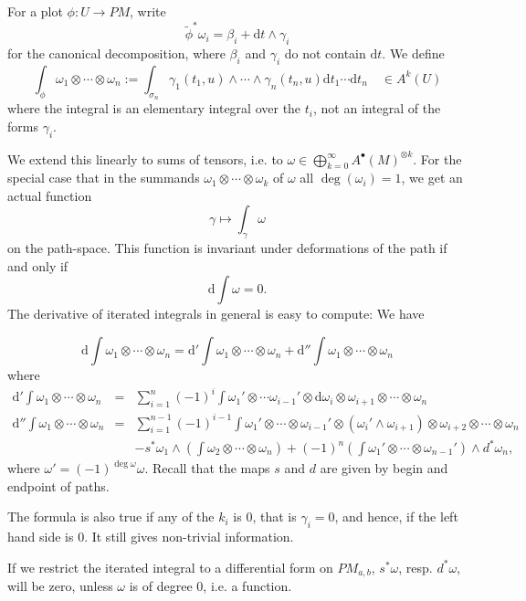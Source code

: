 For a plot $\phi: U \to PM$, write
\[
\widetilde{\phi}^* \omega_i = \beta_i + \mathrm{d}t \wedge \gamma_i
\]
for the canonical decomposition, where $\beta_i$ and $\gamma_i$ do not contain $\mathrm{d}t$.
We define
\[
\int_\phi \omega_1 \otimes \cdots \otimes \omega_n := \int_{\sigma_n} \gamma_1(t_1, u) \wedge \cdots \wedge \gamma_n(t_n, u) \mathrm{d}t_1 \cdots \mathrm{d}t_n \quad \in A^k(U)
\]
where the integral is an elementary integral over the $t_i$, not an integral of the forms $\gamma_i$.

We extend this linearly to sums of tensors, i.e. to $\omega \in \bigoplus_{k=0}^\infty A^\bullet(M)^{\otimes k}$.
For the special case that in the summands $\omega_1 \otimes \cdots \otimes \omega_k$ of $\omega$ all $\deg(\omega_i)=1$, we get an actual function 
\[ \gamma \mapsto \int_\gamma \omega  \]
on the path-space.
This function is invariant under deformations of the path if and only if
\[ \mathrm{d} \int \omega = 0. \]
The derivative of iterated integrals in general is easy to compute: We have

\begin{prop}\label{hoermannprop1}
\[
\mathrm{d} \int \omega_1 \otimes \cdots  \otimes  \omega_n = \mathrm{d}' \int \omega_1 \otimes  \cdots  \otimes \omega_n + \mathrm{d}'' \int \omega_1  \otimes \cdots  \otimes \omega_n
\]
where
\[
\begin{array}{rcl}
\mathrm{d}' \int \omega_1  \otimes \cdots \otimes  \omega_n & = & \sum_{i = 1}^n (-1)^i \int \omega_1' \otimes  \cdots \omega_{i-1}'  \otimes \mathrm{d}\omega_i  \otimes \omega_{i+1}  \otimes \cdots  \otimes \omega_n \\
\mathrm{d}'' \int \omega_1  \otimes \cdots  \otimes \omega_n & = & \sum_{i=1}^{n-1} (-1)^{i-1} \int \omega_1'  \otimes \cdots  \otimes \omega_{i-1}'  \otimes (\omega_i' \wedge \omega_{i+1})  \otimes \omega_{i+2}  \otimes \cdots  \otimes \omega_n \\
&&- s^* \omega_1 \wedge (\int \omega_2  \otimes \cdots  \otimes \omega_n) + (-1)^n (\int \omega_1'  \otimes \cdots  \otimes \omega_{n-1}') \wedge d^* \omega_n,
\end{array}
\]
where $\omega' = (-1)^{\deg \omega} \omega$. Recall that the maps $s$ and $d$ are given by begin and endpoint of paths.
\end{prop}

\begin{rem}
The formula is also true if any of the $k_i$ is 0, that is $\gamma_i=0$, and hence, if the left hand side is 0. It still gives
non-trivial information. 
\end{rem}
\begin{rem}
If we restrict the iterated integral to a differential form on $PM_{a,b}$, $s^*\omega$, resp. $d^*\omega$, will be 
zero, unless $\omega$ is of degree 0, i.e. a function.
\end{rem}

